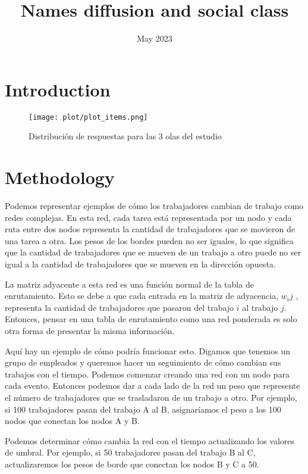 \documentclass{article}
\title{Names diffusion and social class}
\author{}
\date{May 2023}
\begin{document}
\maketitle

\section{Introduction}


\begin{figure}[H]
    \centering
    \texttt{[image: plot/plot\_items.png]}
    \caption{Distribución de respuestas para las 3 olas del estudio}
    \label{fig:galaxy}
\end{figure}

\section{Methodology}

Podemos representar ejemplos de cómo los trabajadores cambian de trabajo como redes complejas. En esta red, cada tarea está representada por un nodo y cada ruta entre dos nodos representa la cantidad de trabajadores que se movieron de una tarea a otra. Los pesos de los bordes pueden no ser iguales, lo que significa que la cantidad de trabajadores que se mueven de un trabajo a otro puede no ser igual a la cantidad de trabajadores que se mueven en la dirección opuesta.

La matriz adyacente a esta red es una función normal de la tabla de enrutamiento. Esto se debe a que cada entrada en la matriz de adyacencia, \(w_ij \)  , representa la cantidad de trabajadores que pasaron del trabajo \( i\) al trabajo \( j \). Entonces, pensar en una tabla de enrutamiento como una red ponderada es solo otra forma de presentar la misma información.

Aquí hay un ejemplo de cómo podría funcionar esto. Digamos que tenemos un grupo de empleados y queremos hacer un seguimiento de cómo cambian sus trabajos con el tiempo. Podemos comenzar creando una red con un nodo para cada evento. Entonces podemos dar a cada lado de la red un peso que represente el número de trabajadores que se trasladaron de un trabajo a otro. Por ejemplo, si 100 trabajadores pasan del trabajo A al B, asignaríamos el peso a los 100 nodos que conectan los nodos A y B.

Podemos determinar cómo cambia la red con el tiempo actualizando los valores de umbral. Por ejemplo, si 50 trabajadores pasan del trabajo B al C, actualizaremos los pesos de borde que conectan los nodos B y C a 50.
\end{document}
